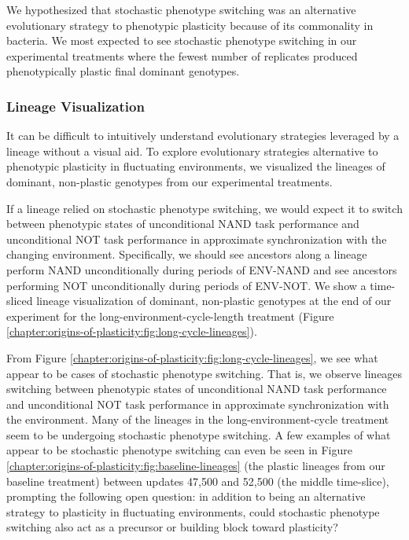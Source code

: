 We hypothesized that stochastic phenotype switching was an alternative evolutionary strategy to phenotypic plasticity because of its commonality in bacteria. 
We most expected to see stochastic phenotype switching in our experimental treatments where the fewest number of replicates produced phenotypically plastic final dominant genotypes. 

\subsubsection{Lineage Visualization}

It can be difficult to intuitively understand evolutionary strategies leveraged by a lineage without a visual aid.
To explore evolutionary strategies alternative to phenotypic plasticity in fluctuating environments, we visualized the lineages of dominant, non-plastic genotypes from our experimental treatments. 



If a lineage relied on stochastic phenotype switching, we would expect it to switch between phenotypic states of unconditional NAND task performance and unconditional NOT task performance in approximate synchronization with the changing environment. 
Specifically, we should see ancestors along a lineage perform NAND unconditionally during periods of ENV-NAND and see ancestors performing NOT unconditionally during periods of ENV-NOT. 
We show a time-sliced lineage visualization of dominant, non-plastic genotypes at the end of our experiment for the long-environment-cycle-length treatment (Figure \ref{chapter:origins-of-plasticity:fig:long-cycle-lineages}).  

From Figure \ref{chapter:origins-of-plasticity:fig:long-cycle-lineages}, we see what appear to be cases of stochastic phenotype switching.
That is, we observe lineages switching between phenotypic states of unconditional NAND task performance and unconditional NOT task performance in approximate synchronization with the environment. 
Many of the lineages in the long-environment-cycle treatment seem to be undergoing stochastic phenotype switching. 
A few examples of what appear to be stochastic phenotype switching can even be seen in Figure \ref{chapter:origins-of-plasticity:fig:baseline-lineages} (the plastic lineages from our baseline treatment) between updates 47,500 and 52,500 (the middle time-slice), prompting the following open question: in addition to being an alternative strategy to plasticity in fluctuating environments, could stochastic phenotype switching also act as a precursor or building block toward plasticity? 

